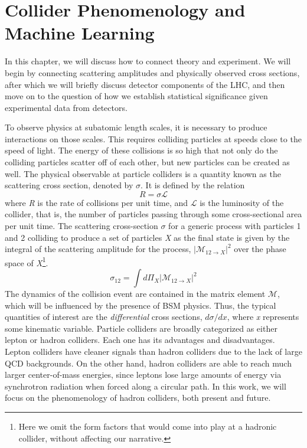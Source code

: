 \chapter{Collider Phenomenology and Machine Learning}\label{ch:ColliderPheno}
In this chapter, we will discuss how to connect theory and experiment. We will begin by connecting scattering amplitudes and physically observed cross sections, after which we will briefly discuss detector components of the LHC, and then move on to the question of how we establish statistical significance given experimental data from detectors.

To observe physics at subatomic length scales, it is necessary to produce interactions on those scales. This requires colliding particles at speeds close to the speed of light. The energy of these collisions is so high that not only do the colliding particles scatter off of each other, but new particles can be created as well. 
The physical observable at particle colliders is a quantity known as the scattering cross section, denoted by $\sigma$. It is defined by the relation
\[R = \sigma\mathcal{L}\]
where \emph{R} is the rate of collisions per unit time, and $\mathcal{L}$ is the luminosity of the collider, that is, the number of particles passing through some cross-sectional area per unit time. The scattering cross-section $\sigma$ for a generic process with particles 1 and 2 colliding to produce a set of particles \emph{X} as the final state is given by the integral of the scattering amplitude for the process, $|\mathcal{M}_{12\rightarrow X}|^2$ over the phase space of \emph{X}\footnote{Here we omit the form factors that would come into play at a hadronic collider, without affecting our narrative.}. 
\begin{equation}
  \sigma_{12} = \int d\Pi_X |\mathcal{M}_{12\rightarrow X}|^2
\end{equation}
The dynamics of the collision event are contained in the matrix element $\mathcal{M}$, which will be influenced by the presence of BSM physics.
Thus, the typical quantities of interest are the \emph{differential} cross sections, $d\sigma/dx$, where \emph{x} represents some kinematic variable. 
Particle colliders are broadly categorized as either lepton or hadron colliders. Each one has its advantages and disadvantages. Lepton colliders have cleaner signals than hadron colliders due to the lack of large QCD backgrounds. On the other hand, hadron colliders are able to reach much larger center-of-mass energies, since leptons lose large amounts of energy via synchrotron radiation when forced along a circular path. In this work, we will focus on the phenomenology of hadron colliders, both present and future.
